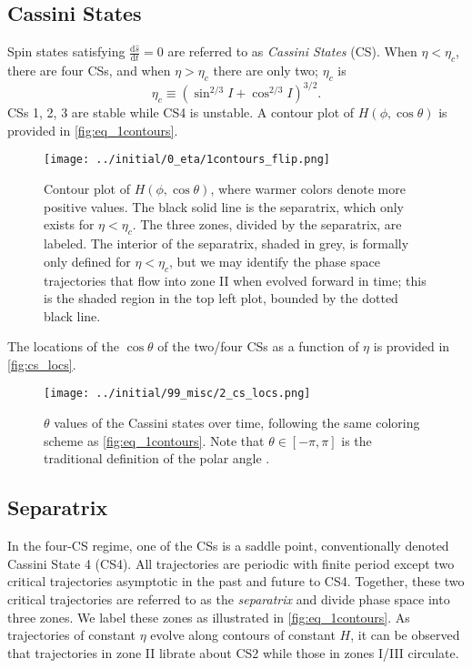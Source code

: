 \documentclass[
        fleqn,
        usenatbib,
    ]{mnras}
\newcommand*{\rd}[2]{\frac{\mathrm{d}#1}{\mathrm{d}#2}}
\newcommand*{\p}[1]{\left(#1\right)}
\begin{document}
\subsection{Cassini States}\label{ss:cs}

Spin states satisfying $\rd{\hat{s}}{t} = 0$ are referred to as \emph{Cassini
States} (CS). When $\eta < \eta_c$, there are four CSs, and when $\eta > \eta_c$
there are only two; $\eta_c$ is \citep{henrard1987,ward2004I}
\begin{equation}
    \eta_c \equiv \p{\sin^{2/3}I + \cos^{2/3}I}^{3/2}.
\end{equation}
CSs 1, 2, 3 are stable while CS4 is unstable. A contour plot of $H\p{\phi, \cos
\theta}$ is provided in \autoref{fig:eq_1contours}.
\begin{figure}
    \centering
    \texttt{[image: ../initial/0\_eta/1contours\_flip.png]}
    \caption{Contour plot of $H\p{\phi, \cos \theta}$, where warmer colors
    denote more positive values. The black solid line is the separatrix, which
    only exists for $\eta < \eta_c$. The three zones, divided by the separatrix,
    are labeled. The interior of the separatrix, shaded in grey, is formally
    only defined for $\eta < \eta_c$, but we may identify the phase space
    trajectories that flow into zone II when evolved forward in time; this is
    the shaded region in the top left plot, bounded by the dotted black
    line.}\label{fig:eq_1contours}
\end{figure}

The locations of the $\cos\theta$ of the two/four CSs as a function of $\eta$ is
provided in \autoref{fig:cs_locs}.
\begin{figure}
    \centering
    \texttt{[image: ../initial/99\_misc/2\_cs\_locs.png]}
    \caption{$\theta$ values of the Cassini states over time, following the same
    coloring scheme as \autoref{fig:eq_1contours}. Note that $\theta \in [-\pi,
    \pi]$ is the traditional definition of the polar angle
    \citep[see e.g.][]{colombo1966,peale1969,henrard1987}.}\label{fig:cs_locs}
\end{figure}

\subsection{Separatrix}

In the four-CS regime, one of the CSs is a saddle point, conventionally denoted
Cassini State 4 (CS4). All trajectories are periodic with finite period except
two critical trajectories asymptotic in the past and future to CS4. Together,
these two critical trajectories are referred to as the \emph{separatrix} and
divide phase space into three zones. We label these zones as illustrated in
\autoref{fig:eq_1contours}. As trajectories of constant $\eta$ evolve along
contours of constant $H$, it can be observed that trajectories in zone II
librate about CS2 while those in zones I/III circulate.
\end{document}
